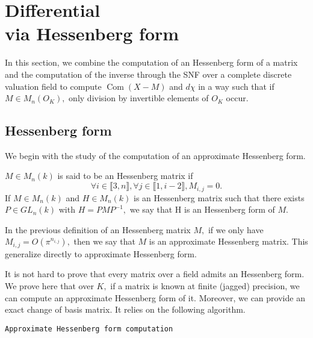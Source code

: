 \documentclass{sig-alternate-05-2015}
\DeclareMathOperator{\com}{Com}
\begin{document}
\section{Differential\\via Hessenberg form}

In this section, we combine the computation of an Hessenberg form
of a matrix and the computation of the inverse through the SNF
over a complete discrete valuation field
to compute $\com (X-M)$ and $d \chi$
in a way such that if $M \in M_n(O_K),$
only division by invertible elements of $O_K$
occur.

\subsection{Hessenberg form}

We begin with the study of the computation of
an approximate Hessenberg form.

\begin{deftn}
$M \in M_n (k)$ is said to be an Hessenberg matrix if
\[\forall i \in \llbracket 3, n \rrbracket, 
\forall j \in \llbracket 1, i-2 \rrbracket, M_{i,j}=0. \]
If $M \in M_n (k)$ and $H \in M_n (k)$ is an Hessenberg 
matrix such that there exists $P \in GL_n(k)$
with $H=PMP^{-1},$ we say that H is an Hessenberg form
of $M.$
\end{deftn}

\begin{deftn}
In the previous definition of an Hessenberg matrix $M,$
 if we only have $M_{i,j}= O(\pi^{n_{i,j}}),$ then we say
 that $M$ is an approximate Hessenberg matrix.
 This generalize directly to approximate Hessenberg form. 
\end{deftn}

It is not hard to prove that every matrix over a field admits
an Hessenberg form.
We prove here that over $K,$ if a matrix is 
known at finite (jagged) precision,
we can compute an approximate Hessenberg form of it.
Moreover, we can provide an exact change of basis matrix.
It relies on the following algorithm.


\noindent\hrulefill

 {\tt Approximate Hessenberg form computation}
\end{document}
